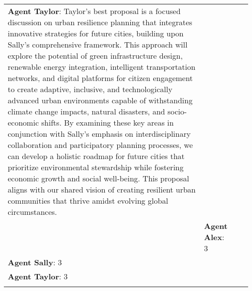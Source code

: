 \documentclass{article}
\begin{document}
\begin{appendix}
\begin{tabular}{| m{2cm} | m{3cm} | m{5cm} | m{5cm} |}
\textbf{Agent Taylor}: Taylor's best proposal is a focused discussion on urban resilience planning that integrates innovative strategies for future cities, building upon Sally's comprehensive framework. This approach will explore the potential of green infrastructure design, renewable energy integration, intelligent transportation networks, and digital platforms for citizen engagement to create adaptive, inclusive, and technologically advanced urban environments capable of withstanding climate change impacts, natural disasters, and socio-economic shifts. By examining these key areas in conjunction with Sally's emphasis on interdisciplinary collaboration and participatory planning processes, we can develop a holistic roadmap for future cities that prioritize environmental stewardship while fostering economic growth and social well-being. This proposal aligns with our shared vision of creating resilient urban communities that thrive amidst evolving global circumstances. \\ 
 & \textbf{Agent Alex}: 3 \\ 
\textbf{Agent Sally}: 3 \\ 
\textbf{Agent Taylor}: 3 \\ 
 \\
\hline

\end{tabular}
\end{appendix}
\end{document}
